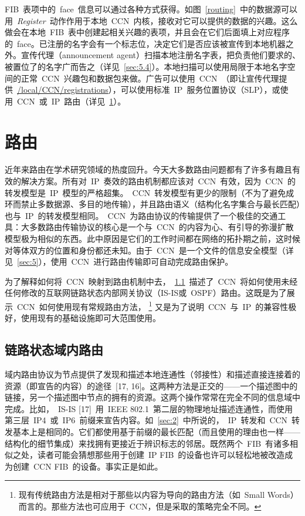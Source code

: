 FIB~表项中的~face~信息可以通过各种方式获得。如图~\ref{routing}~中的数据源可以用~\emph{Register}~动作作用于本地~CCN~内核，接收对它可以提供的数据的兴趣。这么做会在本地~FIB~表中创建起相关兴趣的表项，并且会在它们后面填上对应程序的~face。已注册的名字会有一个标志位，决定它们是否应该被宣传到本地机器之外。宣传代理（announcement agent）扫描本地注册名字表，把负责他们要求的、被置位了的名字广而告之（详见~\ref{sec:5.4}）。本地扫描可以使用局限于本地名字空间的正常~CCN~兴趣包和数据包来做。广告可以使用~CCN~（即让宣传代理提供~\url{/local/CCN/registrations}），可以使用标准~IP~服务位置协议（SLP），或使用~CCN~或~IP~路由（详见~\ref{sec:4}）。%

\section{路由}
\label{sec:4}
近年来路由在学术研究领域的热度回升。今天大多数路由问题都有了许多有趣且有效的解决方案。所有对~IP~奏效的路由机制都应该对~CCN~有效，因为~CCN~的转发模型是~IP~模型的严格超集。~CCN~转发模型有更少的限制（不为了避免成环而禁止多数据源、多目的地传输），并且路由语义（结构化名字集合与最长匹配）也与~IP~的转发模型相同。~CCN~为路由协议的传输提供了一个极佳的交通工具：大多数路由传输协议的核心是一个与~CCN~的内容为心、有引导的弥漫扩散模型极为相似的东西。此中原因是它们的工作时间都在网络的拓扑期之前，这时候对等体双方的位置和身份都还未知。由于~CCN~是一个文件的信息安全模型（详见~\ref{sec:5}），使用~CCN~进行路由传输即可自动完成路由保护。

为了解释如何将~CCN~映射到路由机制中去，~\ref{sec:4.1}~描述了~CCN~将如何使用未经任何修改的互联网链路状态内部网关协议（IS-IS或~OSPF）路由。这既是为了展示~CCN~如何使用现有常规路由方法，
\renewcommand\baselinestretch{1} %
\footnote{现有传统路由方法是相对于那些以内容为导向的路由方法（如~Small Words）而言的。那些方法也可应用于~CCN，但是采取的策略完全不同。}
又是为了说明~CCN~与~IP~的兼容性极好，使用现有的基础设施即可大范围使用。

\subsection{链路状态域内路由}
\label{sec:4.1}
域内路由协议为节点提供了发现和描述本地连通性（邻接性）和描述直接连接着的资源（即宣告的内容）的途径~[17, 16]。这两种方法是正交的——一个描述图中的链接，另一个描述图中节点的拥有的资源。这两个操作常常在完全不同的信息域中完成。比如，~IS-IS [17]~用~IEEE 802.1~第二层的物理地址描述连通性，而使用第三层~IP4~或~IP6~前缀来宣告内容。如~\ref{sec:2}~中所说的，~IP~转发和~CCN~转发基本上是相同的。它们都使用基于前缀的最长匹配（而且使用的理由也一样——结构化的细节集成）来找拥有更接近于辨识标志的邻居。既然两个~FIB~有诸多相似之处，读者可能会猜想那些用于创建~IP FIB~的设备也许可以轻松地被改造成为创建~CCN FIB~的设备。事实正是如此。

